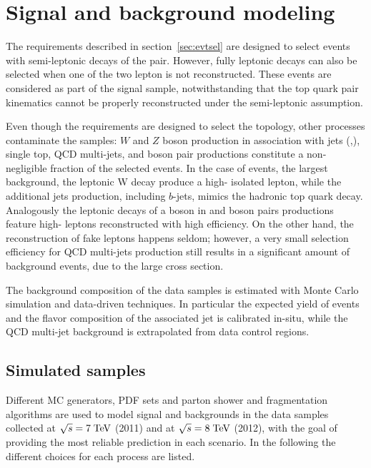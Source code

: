 \section{Signal and background modeling}
\label{sec:bckgmodel}

The requirements described in section~\ref{sec:evtsel} are designed to
select events with semi-leptonic decays of the \ttbar{} pair. However, fully
leptonic decays can also be selected when one of the two lepton is not
reconstructed. These events are considered as part of the signal
sample, notwithstanding that the top quark pair kinematics cannot be
properly reconstructed under the semi-leptonic assumption.

Even though the requirements are designed to select the \ttbar{}
topology, other processes contaminate the samples: $W$ and $Z$ boson
production in association with jets (\wjets{},\zjets{}), single top,
QCD multi-jets, and boson pair productions constitute a non-negligible
fraction of the selected events.
In the case of \wjets{} events, the largest background, the leptonic W
decay produce a high-\pt{} isolated lepton, while the additional jets
production, including $b$-jets, mimics the hadronic top quark decay.
Analogously the leptonic decays of a boson in \zjets{} and boson pairs
productions feature high-\pt{} leptons reconstructed with high
efficiency.
On the other hand, the reconstruction of fake leptons happens seldom;
however, a very small selection efficiency for QCD multi-jets
production still results in a significant amount of background
events, due to the large cross section.

The background composition of the data samples is estimated with Monte
Carlo simulation and data-driven techniques. In particular the
expected yield of \wjets{} events and the flavor composition of the
associated jet is calibrated in-situ, while the QCD
multi-jet background is extrapolated from data control regions.

\subsection{Simulated samples}
\label{sec:mcsamples}

Different MC generators, PDF sets and parton shower and fragmentation
algorithms are used to model signal and backgrounds in the data
samples collected at $\sqrt{s} = 7 \; \mathrm{TeV}{}$ (2011) and at $\sqrt{s} = 8
\; \mathrm{TeV}{}$ (2012), with the goal of providing the most reliable
prediction in each scenario. In the following the different choices
for each process are listed.

